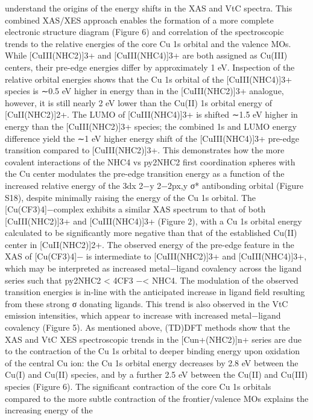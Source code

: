\documentclass{article}
\begin{document}
understand the origins of the energy shifts in the XAS and VtC
spectra. This combined XAS/XES approach enables the
formation of a more complete electronic structure diagram
(Figure 6) and correlation of the spectroscopic trends to the
relative energies of the core Cu 1s orbital and the valence
MOs.
While [CuIII(NHC2)]3+ and [CuIII(NHC4)]3+ are both
assigned as Cu(III) centers, their pre-edge energies diﬀer by
approximately 1 eV. Inspection of the relative orbital energies
shows that the Cu 1s orbital of the [CuIII(NHC4)]3+ species is
∼0.5 eV higher in energy than in the [CuIII(NHC2)]3+
analogue, however, it is still nearly 2 eV lower than the Cu(II)
1s orbital energy of [CuII(NHC2)]2+. The LUMO of
[CuIII(NHC4)]3+ is shifted ∼1.5 eV higher in energy than
the [CuIII(NHC2)]3+ species; the combined 1s and LUMO
energy diﬀerence yield the ∼1 eV higher energy shift of the
[CuIII(NHC4)]3+
pre-edge
transition
compared
to
[CuIII(NHC2)]3+. This demonstrates how the more covalent
interactions of the NHC4 vs py2NHC2 ﬁrst coordination
spheres with the Cu center modulates the pre-edge transition
energy as a function of the increased relative energy of the
3dx
2−y
2−2px,y σ* antibonding orbital (Figure S18), despite
minimally raising the energy of the Cu 1s orbital.
The [Cu(CF3)4]−complex exhibits a similar XAS spectrum
to that of both [CuIII(NHC2)]3+ and [CuIII(NHC4)]3+ (Figure
2), with a Cu 1s orbital energy calculated to be signiﬁcantly
more negative than that of the established Cu(II) center in
[CuII(NHC2)]2+. The observed energy of the pre-edge feature
in
the
XAS
of
[Cu(CF3)4]−
is
intermediate
to
[CuIII(NHC2)]3+ and [CuIII(NHC4)]3+, which may be
interpreted as increased metal−ligand covalency across the
ligand series such that py2NHC2 < 4CF3
−< NHC4. The
modulation of the observed transition energies is in-line with
the anticipated increase in ligand ﬁeld resulting from these
strong σ donating ligands. This trend is also observed in the
VtC emission intensities, which appear to increase with
increased metal−ligand covalency (Figure 5).
As mentioned above, (TD)DFT methods show that the XAS
and VtC XES spectroscopic trends in the [Cun+(NHC2)]n+
series are due to the contraction of the Cu 1s orbital to deeper
binding energy upon oxidation of the central Cu ion: the Cu 1s
orbital energy decreases by 2.8 eV between the Cu(I) and
Cu(II) species, and by a further 2.5 eV between the Cu(II) and
Cu(III) species (Figure 6). The signiﬁcant contraction of the
core Cu 1s orbitals compared to the more subtle contraction of
the frontier/valence MOs explains the increasing energy of the
\end{document}
